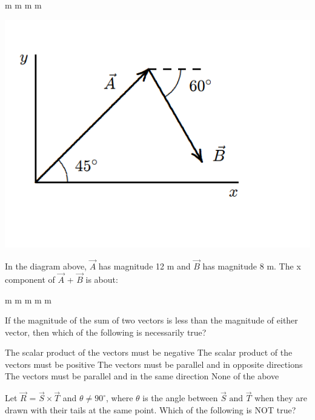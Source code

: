 \documentclass[12pt,addpoints]{exam}
\begin{document}
{{{\begin{questions}
					\begin{oneparchoices}
						 m
						 m
						 m
						 m
					\end{oneparchoices}
					\begin{center}
						\includegraphics[scale=0.3]{vecs3.png}
					\end{center}
					\question In the diagram above, $\vec{A}$ has magnitude 12 m and $\vec{B}$ has magnitude 8 m. The x component of $\vec{A}$ + $\vec{B}$
					is about: \\
					\begin{oneparchoices}
						\choice 12 m
						\choice 7.2 m
						\choice 19 m
						\choice 20 m
						\choice 18 m
					\end{oneparchoices}
					\question If the magnitude of the sum of two vectors is less than the magnitude of either vector, then which of the following is necessarily true?
					\begin{choices}
						\choice The scalar product of the vectors must be negative
						\choice The scalar product of the vectors must be positive
						\choice The vectors must be parallel and in opposite directions
						\choice The vectors must be parallel and in the same direction
						\choice None of the above
					\end{choices}
					\question Let $\vec{R}$ = $\vec{S}\times\vec{T}$ and $\theta\neq90^\circ$, where $\theta$ is the angle between $\vec{S}\text{ and }\vec{T}$ when they are drawn with their tails at the same point. Which of the following is NOT true? \\
					\begin{oneparchoices}

\end{oneparchoices}
\end{questions}}}}
\end{document}
